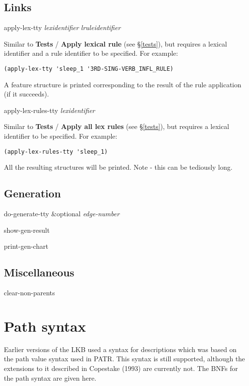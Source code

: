 \documentclass[12pt]{report}
\newcommand{\lispcommand}[1]{\noindent\rm #1}%
\begin{document}
\section{Links}
\lispcommand{apply-lex-tty {\it lexidentifier} {\it lruleidentifier}}

Similar to {\bf Tests} / {\bf Apply lexical rule} (see \S\ref{tests}),
but requires a lexical identifier and a rule identifier to be specified.
For example:
\begin{verbatim}
(apply-lex-tty 'sleep_1 '3RD-SING-VERB_INFL_RULE)
\end{verbatim}
A feature structure is printed corresponding to the result 
of the rule application (if it succeeds).

\lispcommand{apply-lex-rules-tty {\it lexidentifier} }

Similar to {\bf Tests} / {\bf Apply all lex rules} (see \S\ref{tests}),
but requires a lexical identifier to be specified.
For example:
\begin{verbatim}
(apply-lex-rules-tty 'sleep_1)
\end{verbatim}
All the resulting structures will be printed.  Note - this can be
tediously long.

\section{Generation}

\lispcommand{do-generate-tty \&optional {\it edge-number}}

\lispcommand{show-gen-result}

\lispcommand{print-gen-chart}

\section{Miscellaneous}

\lispcommand{clear-non-parents}



\chapter{Path syntax}
\label{pathbnf}

Earlier versions of the LKB used a syntax for descriptions
which was based on the path value syntax used in PATR.
This syntax is still supported, although the extensions to it
described in Copestake (1993) are currently not.
The BNFs for the path syntax are given here.
\end{document}
